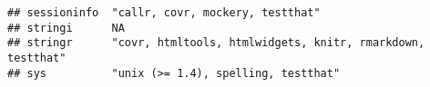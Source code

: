 \documentclass[]{book}
\begin{document}
\begin{verbatim}
## sessioninfo  "callr, covr, mockery, testthat"                                                                                                                                                                                                                                                                                                                                                                                                                                                                                                                                                                                                                                                                          
## stringi      NA                                                                                                                                                                                                                                                                                                                                                                                                                                                                                                                                                                                                                                                                                                        
## stringr      "covr, htmltools, htmlwidgets, knitr, rmarkdown, testthat"                                                                                                                                                                                                                                                                                                                                                                                                                                                                                                                                                                                                                                                
## sys          "unix (>= 1.4), spelling, testthat"                                                                                                                                                                                                                                                                                                                                                                                                                                                                                                                                                                                                                                                                       

\end{verbatim}
\end{document}
